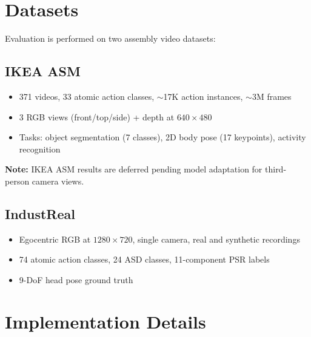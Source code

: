 \documentclass[10pt,twocolumn]{article}
\begin{document}
\section{Datasets}
\label{sec:datasets}

Evaluation is performed on two assembly video datasets:

\subsection{IKEA ASM~\cite{benshabat2021ikea}}
\begin{itemize}[nosep]
\item 371 videos, 33 atomic action classes, $\sim$17K action instances, $\sim$3M frames
\item 3 RGB views (front/top/side) + depth at $640\times480$
\item Tasks: object segmentation (7 classes), 2D body pose (17 keypoints), activity recognition
\end{itemize}

\textbf{Note:} IKEA ASM results are deferred pending model adaptation for third-person camera views.

\subsection{IndustReal~\cite{schoonbeek2024industreal}}
\begin{itemize}[nosep]
\item Egocentric RGB at $1280\times720$, single camera, real and synthetic recordings
\item 74 atomic action classes, 24 ASD classes, 11-component PSR labels
\item 9-DoF head pose ground truth
\end{itemize}

\section{Implementation Details}
\label{sec:implementation}
\end{document}
